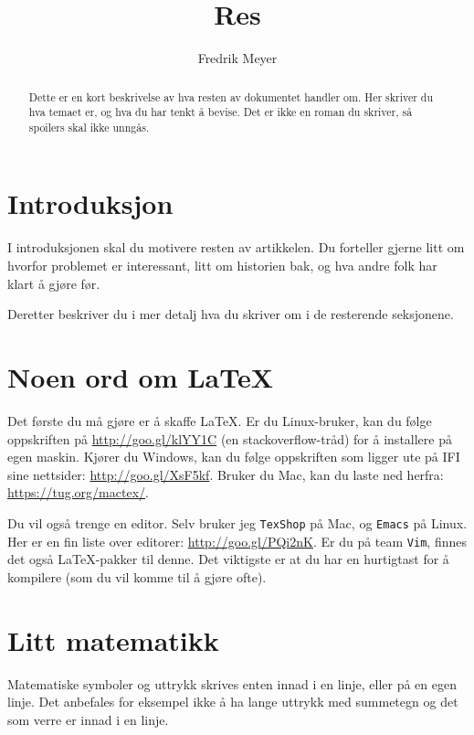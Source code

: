 \documentclass[11pt, english, a4paper]{article}
\begin{document}
\title{Res}
\author{Fredrik Meyer}
\maketitle 

\begin{abstract}
\noindent
Dette er en kort beskrivelse av hva resten av dokumentet handler om. Her skriver du hva temaet er, og hva du har tenkt å bevise. Det er ikke en roman du skriver, så spoilers skal ikke unngås.
\end{abstract}

\section{Introduksjon}

I introduksjonen skal du motivere resten av artikkelen. Du forteller gjerne litt om hvorfor problemet er interessant, litt om historien bak, og hva andre folk har klart å gjøre før.

Deretter beskriver du i mer detalj hva du skriver om i de resterende seksjonene. 

\section{Noen ord om \LaTeX}

Det første du må gjøre er å skaffe \LaTeX. Er du Linux-bruker, kan du følge oppskriften på \url{http://goo.gl/klYY1C} (en stackoverflow-tråd) for å installere på egen maskin. Kjører du Windows, kan du følge oppskriften som ligger ute på IFI sine nettsider: \url{http://goo.gl/XsF5kf}. Bruker du Mac, kan du laste ned herfra: \url{https://tug.org/mactex/}.

Du vil også trenge en editor. Selv bruker jeg \texttt{TexShop} på Mac, og \texttt{Emacs} på Linux. Her er en fin liste over editorer: \url{http://goo.gl/PQi2nK}. Er du på team \texttt{Vim}, finnes det også \LaTeX-pakker til denne. Det viktigste er at du har en hurtigtast for å kompilere (som du vil komme til å gjøre ofte).


\section{Litt matematikk}

Matematiske symboler og uttrykk skrives enten innad i en linje, eller på en egen linje. Det anbefales for eksempel ikke å ha lange uttrykk med summetegn og det som verre er innad i en linje.
\end{document}
